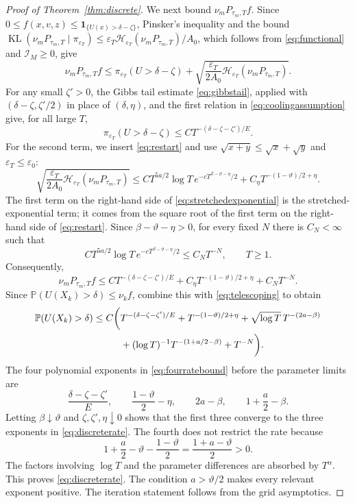 \documentclass[11pt]{article}
\theoremstyle{definition}
\newcommand{\KL}{\operatorname{KL}}
\newcommand{\cH}{\mathcal H}
\newcommand{\cI}{\mathcal I}
\newcommand{\eps}{\varepsilon}
\begin{document}
\begin{proof}[Proof of Theorem~\ref{thm:discrete}]
We next bound $\nu_mP_{\tau_m,T}f$. Since
$0\leq f(x,v,z)\leq\mathbf 1_{\{U(x)>\delta-\zeta\}}$, Pinsker's inequality and
the bound
$\KL(\nu_mP_{\tau_m,T}\mid\pi_{\eps_T})
\leq\eps_T\cH_{\eps_T}(\nu_mP_{\tau_m,T})/A_0$, which follows from
\eqref{eq:functional} and $\cI_M\geq0$, give
\[
 \nu_mP_{\tau_m,T}f
 \leq\pi_{\eps_T}(U>\delta-\zeta)
      +\sqrt{\frac{\eps_T}{2A_0}\cH_{\eps_T}(\nu_mP_{\tau_m,T})}.
\]
For any small $\zeta'>0$, the Gibbs tail estimate \eqref{eq:gibbstail},
applied with $(\delta-\zeta,\zeta'/2)$ in place of $(\delta,\eta)$, and the
first relation in \eqref{eq:coolingassumption} give, for all large $T$,
\[
 \pi_{\eps_T}(U>\delta-\zeta)\leq CT^{-(\delta-\zeta-\zeta')/E}.
\]
For the second term, we insert \eqref{eq:restart} and use
$\sqrt{x+y}\leq\sqrt x+\sqrt y$ and $\eps_T\leq\eps_0$:
\begin{equation}\label{eq:stretchedexponential}
 \sqrt{\frac{\eps_T}{2A_0}\cH_{\eps_T}(\nu_mP_{\tau_m,T})}
 \leq CT^{5a/2}\log T\,e^{-cT^{\beta-\vartheta-\eta}/2}
      +C_\eta T^{-(1-\vartheta)/2+\eta}.
\end{equation}
The first term on the right-hand side of \eqref{eq:stretchedexponential} is
the stretched-exponential term; it comes from the square root of the first
term on the right-hand side of \eqref{eq:restart}.
Since $\beta-\vartheta-\eta>0$, for
every fixed $N$ there is $C_N<\infty$ such that
\[
 CT^{5a/2}\log T\,e^{-cT^{\beta-\vartheta-\eta}/2}\leq C_NT^{-N},
 \qquad T\geq1.
\]
Consequently,
\[
 \nu_mP_{\tau_m,T}f
 \leq C T^{-(\delta-\zeta-\zeta')/E}
       +C_\eta T^{-(1-\vartheta)/2+\eta}
       +C_NT^{-N}.
\]
Since $\mathbb P(U(X_k)>\delta)\leq\nu_kf$, combine
this with \eqref{eq:telescoping} to obtain
\begin{align}\label{eq:fourratebound}
 \mathbb P(U(X_k)>\delta)
 \leq C\bigg(&T^{-(\delta-\zeta-\zeta')/E}
 +T^{-(1-\vartheta)/2+\eta}
 +\sqrt{\log T}\,T^{-(2a-\beta)}\notag\\
 &+(\log T)^{-1}T^{-(1+a/2-\beta)}+T^{-N}\bigg).
\end{align}
The four polynomial exponents in \eqref{eq:fourratebound} before the
parameter limits
are
\[
 \frac{\delta-\zeta-\zeta'}{E},\qquad
 \frac{1-\vartheta}{2}-\eta,\qquad
 2a-\beta,\qquad 1+\frac a2-\beta.
\]
Letting $\beta\downarrow\vartheta$ and
$\zeta,\zeta',\eta\downarrow0$ shows that the first three converge to the
three exponents in \eqref{eq:discreterate}. The fourth does not restrict the
rate because
\[
 1+\frac a2-\vartheta-\frac{1-\vartheta}{2}
 =\frac{1+a-\vartheta}{2}>0.
\]
The factors involving $\log T$ and the parameter differences are absorbed by
$T^\alpha$. This proves \eqref{eq:discreterate}.
The condition $a>\vartheta/2$ makes every relevant exponent positive.
The iteration statement follows from the grid asymptotics.
\end{proof}
\end{document}
